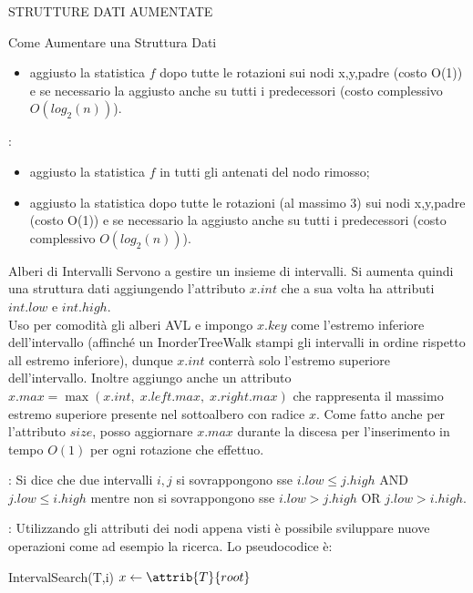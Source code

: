 \documentclass[8pt]{extarticle}
\begin{document}
\begin{formulario}
\begin{myParagraph}{STRUTTURE DATI AUMENTATE}
\begin{subParagraph}{Come Aumentare una Struttura Dati}
\begin{descr}{1}
\begin{itemize}
					\item aggiusto la statistica $f$ dopo tutte le rotazioni sui nodi x,y,padre (costo O(1)) e se necessario la aggiusto anche su tutti i predecessori (costo complessivo $O(log_2(n))$).
				\end{itemize}
				\item[Cancellazione]:\\
				\begin{itemize} 
					\item aggiusto la statistica $f$ in tutti gli antenati del nodo rimosso;
					\item aggiusto la statistica dopo tutte le rotazioni (al massimo 3) sui nodi x,y,padre (costo O(1)) e se necessario la aggiusto anche su tutti i predecessori (costo complessivo $O(log_2(n))$).
				\end{itemize}
			\end{descr}
		\end{subParagraph}
		\begin{subParagraph}{Alberi di Intervalli}
Servono a gestire un insieme di intervalli. Si aumenta quindi una struttura dati aggiungendo l'attributo $x.int$ che a sua volta ha attributi $int.low$ e $int.high$.\\
Uso per comodità gli alberi AVL e impongo $x.key$ come l'estremo inferiore dell'intervallo (affinché un InorderTreeWalk stampi gli intervalli in ordine rispetto all estremo inferiore), dunque $x.int$ conterrà solo l'estremo superiore dell'intervallo. Inoltre aggiungo anche un attributo $x.max=\max(x.int,\; x.left.max,\; x.right.max)$ che rappresenta il massimo estremo superiore presente nel sottoalbero con radice $x$. Come fatto anche per l'attributo $size$, posso aggiornare $x.max$ durante la discesa per l'inserimento in tempo $O(1)$ per ogni rotazione che effettuo.
			\begin{Descr} 
				\item[Sovrapposizione di intervalli]: Si dice che due intervalli $i,j$ si sovrappongono sse $i.low\leq j.high$ AND $j.low\leq i.high$ mentre non si sovrappongono sse $i.low>j.high$ OR $j.low> i.high$.
				\item[Sviluppo di nuove operazioni]: Utilizzando gli attributi dei nodi appena visti è possibile sviluppare nuove operazioni come ad esempio la ricerca. Lo pseudocodice è:
				\begin{code}{IntervalSearch(T,i)}
\li $x \get \attrib{T}{root}$
\li {}
	\li {}

\end{code}
\end{Descr}
\end{subParagraph}
\end{myParagraph}
\end{formulario}
\end{document}
